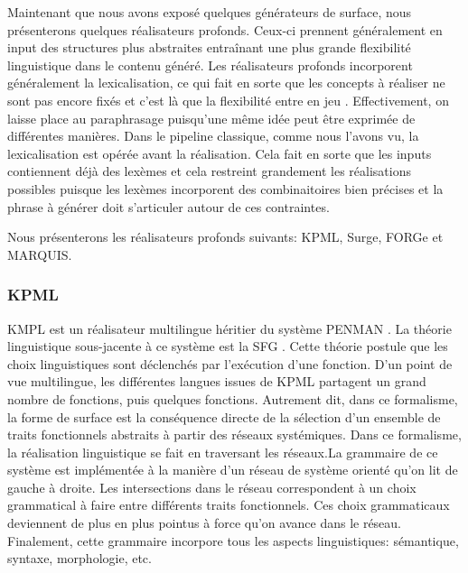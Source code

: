 Maintenant que nous avons exposé quelques générateurs de surface, nous présenterons quelques réalisateurs profonds. Ceux-ci prennent généralement en input des structures plus abstraites entraînant une plus grande flexibilité linguistique dans le contenu généré. Les réalisateurs profonds incorporent généralement la lexicalisation, ce qui fait en sorte que les concepts à réaliser ne sont pas encore fixés et c'est là que la flexibilité entre en jeu \citep{PolguerePourmodelestratifie}. Effectivement, on laisse place au paraphrasage puisqu'une même idée peut être exprimée de différentes manières. Dans le pipeline classique, comme nous l'avons vu, la lexicalisation est opérée avant la réalisation. Cela fait en sorte que les inputs contiennent déjà des lexèmes et cela restreint grandement les réalisations possibles puisque les lexèmes incorporent des combinaitoires bien précises et la phrase à générer doit s'articuler autour de ces contraintes. 

Nous présenterons les réalisateurs profonds suivants: KPML, Surge, FORGe et MARQUIS.

\subsubsection{KPML}
KMPL\citep{BatemanEnablingTechnologyMultilingual1997} est un réalisateur multilingue héritier du système PENMAN \citep{PenmanOverview}. La théorie linguistique sous-jacente à ce système est la \acf{SFG} \citep{MatthiessenSystemicfunctionalgrammar1997}. Cette théorie postule que les choix linguistiques sont déclenchés par l'exécution d'une fonction. D'un point de vue multilingue, les différentes langues issues de KPML partagent un grand nombre de fonctions, puis quelques fonctions. Autrement dit, dans ce formalisme, la forme de surface est la conséquence directe de la sélection d'un ensemble de traits fonctionnels abstraits à partir des réseaux systémiques. Dans ce formalisme, la réalisation linguistique se fait en traversant les réseaux.La grammaire de ce système est implémentée à la manière d'un réseau de système orienté qu'on lit de gauche à droite. Les intersections dans le réseau correspondent à un choix grammatical à faire entre différents traits fonctionnels. Ces choix grammaticaux deviennent de plus en plus pointus à force qu'on avance dans le réseau. Finalement, cette grammaire incorpore tous les aspects linguistiques: sémantique, syntaxe, morphologie, etc.

